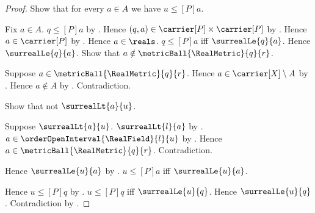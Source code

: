 \begin{proof}
    Show that for every $a\in A$ we have
        $u\mathrel{\leq[P]}a$.
    \begin{subproof}
        Fix $a\in A$.
        $q\mathrel{\leq[P]}a$ by
            .
        Hence $(q,a)\in\carrier[P]\times\carrier[P]$ by
            .
        Hence $a\in\carrier[P]$ by .
        Hence $a\in\reals$.
        $q\mathrel{\leq[P]}a$ iff $\surrealLe{q}{a}$.
        Hence $\surrealLe{q}{a}$.
        Show that $a\notin\metricBall{\RealMetric}{q}{r}$.
        \begin{subproof}
            Suppose $a\in\metricBall{\RealMetric}{q}{r}$.
            Hence $a\in\carrier[X]\setminus A$ by .
            Hence $a\notin A$ by .
            Contradiction.
        \end{subproof}
        Show that not $\surrealLt{a}{u}$.
        \begin{subproof}
            Suppose $\surrealLt{a}{u}$.
            $\surrealLt{l}{a}$ by
                .
            $a\in\orderOpenInterval{\RealField}{l}{u}$ by
                .
            Hence $a\in\metricBall{\RealMetric}{q}{r}$.
            Contradiction.
        \end{subproof}
        Hence $\surrealLe{u}{a}$ by
            .
        $u\mathrel{\leq[P]}a$ iff $\surrealLe{u}{a}$.
    \end{subproof}
    Hence $u\mathrel{\leq[P]}q$ by
        .
    $u\mathrel{\leq[P]}q$ iff $\surrealLe{u}{q}$.
    Hence $\surrealLe{u}{q}$.
    Contradiction by
        .
\end{proof}

